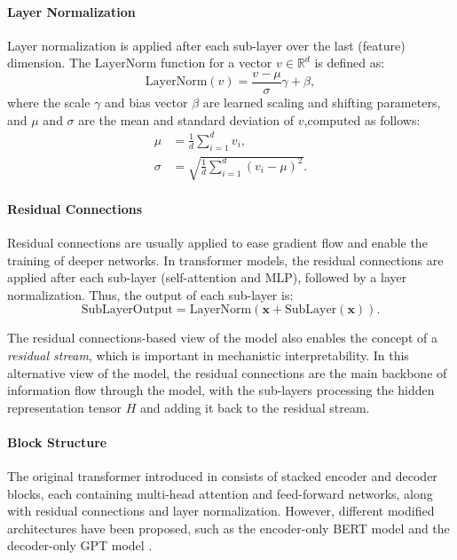\paragraph{Layer Normalization}
Layer normalization \parencite{ba_layer_2016} is applied after each sub-layer over the last (feature) dimension. The $\text{LayerNorm}$ function for a vector $v \in \mathbb{R}^d$ is defined as:
\begin{equation*}
    \text{LayerNorm}(v) = \frac{v - \mu}{\sigma}\gamma + \beta,
\end{equation*}
where the scale $\gamma$ and bias vector $\beta$ are learned scaling and shifting parameters, and $\mu$ and $\sigma$ are the mean and standard deviation of $v$,computed as follows:
\begin{align*}
    \mu    & = \frac{1}{d} \sum_{i=1}^{d} v_i,                  \\
    \sigma & = \sqrt{\frac{1}{d} \sum_{i=1}^{d} (v_i - \mu)^2}.
\end{align*}

\paragraph{Residual Connections}
Residual connections \parencite{he_deep_2016} are usually applied to ease gradient flow and enable the training of deeper networks. In transformer models, the residual connections are applied after each sub-layer (self-attention and MLP), followed by a layer normalization. Thus, the output of each sub-layer is:
\begin{equation*}
    \text{SubLayerOutput} = \text{LayerNorm}(\mathbf{x} + \text{SubLayer}(\mathbf{x})).
\end{equation*}

The residual connections-based view of the model also enables the concept of a \emph{residual stream}, which is important in mechanistic interpretability. In this alternative view of the model, the residual connections are the main backbone of information flow through the model, with the sub-layers processing the hidden representation tensor $H$ and adding it back to the residual stream.

\paragraph{Block Structure}
The original transformer introduced in \cite{vaswani_attention_2017} consists of stacked encoder and decoder blocks, each containing multi-head attention and feed-forward networks, along with residual connections and layer normalization. However, different modified architectures have been proposed, such as the encoder-only BERT model \parencite{devlin_bert_2019} and the decoder-only GPT model \parencite{radford_improving_2018}.

